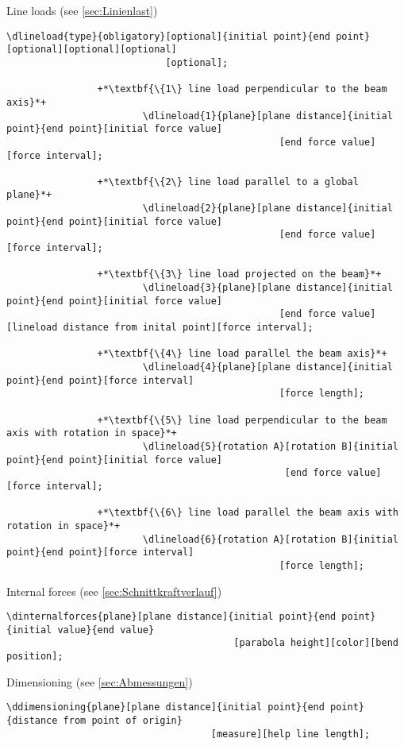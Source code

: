 \documentclass[%
  a4paper,
  BCOR20mm,
  pointlessnumbers,
  twoside,
  halfparskip,
  openright,
]{scrreprt}
\begin{document}
Line loads (see \ref{sec:Linienlast})

\begin{lstlisting}[emph={dlineload},backgroundcolor=\color{white}]
		\dlineload{type}{obligatory}[optional]{initial point}{end point}[optional][optional][optional]
							[optional];
		
				+*\textbf{\{1\} line load perpendicular to the beam axis}*+
						\dlineload{1}{plane}[plane distance]{initial point}{end point}[initial force value]
												[end force value][force interval];
						
				+*\textbf{\{2\} line load parallel to a global plane}*+
						\dlineload{2}{plane}[plane distance]{initial point}{end point}[initial force value]
												[end force value][force interval];
						
				+*\textbf{\{3\} line load projected on the beam}*+
						\dlineload{3}{plane}[plane distance]{initial point}{end point}[initial force value]
												[end force value][lineload distance from inital point][force interval];
						
				+*\textbf{\{4\} line load parallel the beam axis}*+
						\dlineload{4}{plane}[plane distance]{initial point}{end point}[force interval]
												[force length];
						
				+*\textbf{\{5\} line load perpendicular to the beam axis with rotation in space}*+
						\dlineload{5}{rotation A}[rotation B]{initial point}{end point}[initial force value]
												 [end force value][force interval];
						
				+*\textbf{\{6\} line load parallel the beam axis with rotation in space}*+
						\dlineload{6}{rotation A}[rotation B]{initial point}{end point}[force interval]
												[force length];
\end{lstlisting}\vspace{-10mm}

Internal forces (see \ref{sec:Schnittkraftverlauf})

\begin{lstlisting}[emph={dinternalforces},backgroundcolor=\color{white}]
		\dinternalforces{plane}[plane distance]{initial point}{end point}{initial value}{end value}
										[parabola height][color][bend position];
\end{lstlisting}\vspace{-10mm}

Dimensioning (see \ref{sec:Abmessungen})

\begin{lstlisting}[emph={ddimensioning},backgroundcolor=\color{white}]
		\ddimensioning{plane}[plane distance]{initial point}{end point}{distance from point of origin}
									[measure][help line length];
\end{lstlisting}\vspace{-10mm}
\end{document}
